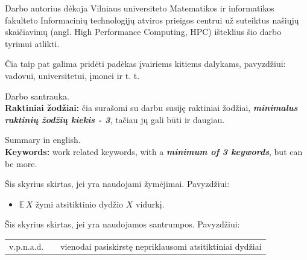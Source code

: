 \documentclass[]{VUMIFTemplateClass}
\newcommand{\EE}{\mathbb{E}\,} %
\begin{document}

\onehalfspacing


Darbo autorius dėkoja Vilniaus universiteto Matematikos ir informatikos fakulteto Informacinių technologijų atviros prieigos centrui už suteiktus našiųjų skaičiavimų (angl. High Performance Computing, HPC) išteklius šio darbo tyrimui atlikti.

Čia taip pat galima pridėti padėkas įvairiems kitiems dalykams, pavyzdžiui: vadovui, universitetui, įmonei ir t. t.


Darbo santrauka.\\

\textbf{Raktiniai žodžiai:} čia surašomi su darbu susiję raktiniai žodžiai, \textit{\textbf{minimalus raktinių žodžių kiekis - 3}}, tačiau jų gali būti ir daugiau.



Summary in english.\\

\textbf{Keywords:} work related keywords, with a \textit{\textbf{minimum of 3 keywords}}, but can be more.


\singlespacing

\listoffigures 

\listoftables

\tableofcontents
\onehalfspacing


Šis skyrius skirtas, jei yra naudojami žymėjimai. Pavyzdžiui:    
\begin{itemize}
    \item $\EE X$ žymi atsitiktinio dydžio $X$ vidurkį.
\end{itemize}

Šis skyrius skirtas, jei yra naudojamos santrumpos. Pavyzdžiui:

\begin{tabular}{rcp{}}
    {v.p.n.a.d.} & {} & {vienodai pasiskirstę nepriklausomi atsitiktiniai dydžiai}
\end{tabular}
\end{document}
